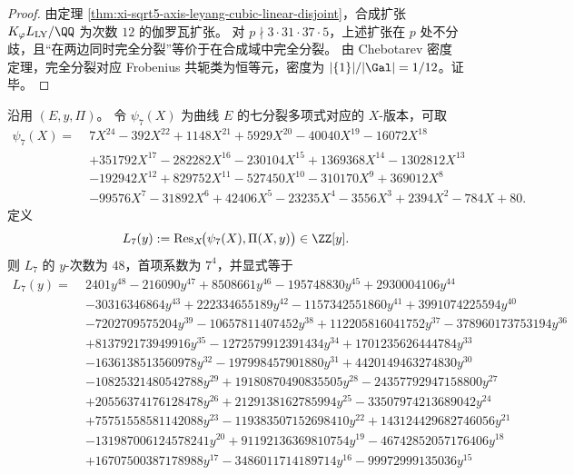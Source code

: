 \begin{proof}
由定理 \ref{thm:xi-sqrt5-axis-leyang-cubic-linear-disjoint}，合成扩张 \(K_\varphi L_{\mathrm{LY}}/\QQ\) 为次数 \(12\) 的伽罗瓦扩张。
对 \(p\nmid 3\cdot 31\cdot 37\cdot 5\)，上述扩张在 \(p\) 处不分歧，且“在两边同时完全分裂”等价于在合成域中完全分裂。
由 Chebotarev 密度定理，完全分裂对应 Frobenius 共轭类为恒等元，密度为 \(|\{1\}|/|\Gal|=1/12\)。证毕。
\end{proof}

\begin{theorem}\label{thm:xi-leyang-image-seven-torsion-elimination-irreducibility-discriminant}
沿用 \((E,y,\Pi)\)。
令 \(\psi_7(X)\) 为曲线 \(E\) 的七分裂多项式对应的 \(X\)-版本，可取
\[
\begin{aligned}
\psi_7(X)=\;&7X^{24}-392X^{22}+1148X^{21}+5929X^{20}-40040X^{19}-16072X^{18}\\
&+351792X^{17}-282282X^{16}-230104X^{15}+1369368X^{14}-1302812X^{13}\\
&-192942X^{12}+829752X^{11}-527450X^{10}-310170X^9+369012X^8\\
&-99576X^7-31892X^6+42406X^5-23235X^4-3556X^3+2394X^2-784X+80.
\end{aligned}
\]
定义
\[
L_7(y):=\operatorname{Res}_X\!\bigl(\psi_7(X),\Pi(X,y)\bigr)\in\ZZ[y].
\]
则 \(L_7\) 的 \(y\)-次数为 \(48\)，首项系数为 \(7^4\)，并显式等于
\[
\begin{aligned}
L_7(y)=\;&2401y^{48}-216090y^{47}+8508661y^{46}-195748830y^{45}+2930004106y^{44}\\
&-30316346864y^{43}+222334655189y^{42}-1157342551860y^{41}+3991074225594y^{40}\\
&-7202709575204y^{39}-10657811407452y^{38}+112205816041752y^{37}-378960173753194y^{36}\\
&+813792173949916y^{35}-1272579912391434y^{34}+1701235626444784y^{33}\\
&-1636138513560978y^{32}-197998457901880y^{31}+4420149463274830y^{30}\\
&-10825321480542788y^{29}+19180870490835505y^{28}-24357792947158800y^{27}\\
&+20556374176128478y^{26}+2129138162785994y^{25}-33507974213689042y^{24}\\
&+75751558581142088y^{23}-119383507152698410y^{22}+143124429682746056y^{21}\\
&-131987006124578241y^{20}+91192136369810754y^{19}-46742852057176406y^{18}\\
&+16707500387178988y^{17}-3486011714189714y^{16}-99972999135036y^{15}\\

\end{aligned}\]
\end{theorem}
